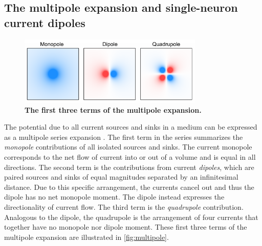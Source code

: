 \subsection{The multipole expansion and single-neuron current dipoles} \label{sec:dipoles}

\begin{figure}
\vspace{-17pt}
\centering
\includegraphics[width=88mm]{Figures/chapter1/multipole_expansion.pdf}
\vspace{-22pt}
\caption[The first three terms of the multipole expansion]{\textbf{The first three terms of the multipole expansion.}}  \label{fig:multipole}
\end{figure}

The potential due to all current sources and sinks in a medium can be expressed as a multipole series expansion \cite{Nunez2006}. The first term in the series summarizes the \textit{monopole} contributions of all isolated sources and sinks. The current monopole corresponds to the net flow of current into or out of a volume and is equal in all directions. The second term is the contributions from current \textit{dipoles}, which are paired sources and sinks of equal magnitudes separated by an infinitesimal distance. Due to this specific arrangement, the currents cancel out and thus the dipole has no net monopole moment. The dipole instead expresses the directionality of current flow. The third term is the \textit{quadrupole} contribution. Analogous to the dipole, the quadrupole is the arrangement of four currents that together have no monopole nor dipole moment. These first three terms of the multipole expansion are illustrated in \autoref{fig:multipole}. 

